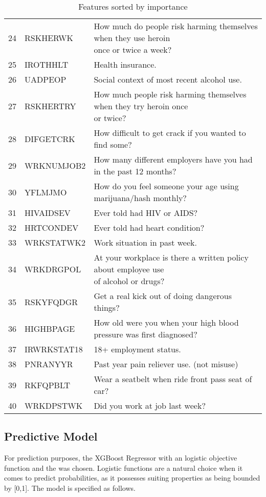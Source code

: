 \documentclass[12pt]{article}
\begin{document}
\begin{table}
\begin{tabular}{c|l|l}
		24 & RSKHERWK	&  \pbox{20cm}{How much do people risk harming themselves when they use heroin\\ once or twice a week?}	\\
		25 & IROTHHLT	& Health insurance.	\\
		26 & UADPEOP	& Social context of most recent alcohol use.	\\
		27 & RSKHERTRY	&\pbox{20cm}{How much people risk harming themselves when they try heroin once\\ or twice?}	\\
		28 & DIFGETCRK	& How difficult to get crack if you wanted to find some?	\\
		29 & WRKNUMJOB2	& How many different employers have you had in the past 12 months?	\\
		30 & YFLMJMO	& How do you feel someone your age using marijuana/hash monthly?	\\
		31 & HIVAIDSEV	& Ever told had HIV or AIDS?	\\
		32 & HRTCONDEV	&Ever told had heart condition?	\\
		33 & WRKSTATWK2	& Work situation in past week.	\\
		34 & WRKDRGPOL	& \pbox{20cm}{At your workplace is there a written policy about employee use\\ of alcohol or drugs?}	\\
		35 & RSKYFQDGR	& Get a real kick out of doing dangerous things?	\\
		36 & HIGHBPAGE	& How old were you when your high blood pressure was first diagnosed?	\\
		37 & IRWRKSTAT18 & 18+ employment status.	\\
		38 & PNRANYYR	& Past year pain reliever use. (not misuse)	\\
		39 & RKFQPBLT	& Wear a seatbelt when ride front pass seat of car?	\\
		40 & WRKDPSTWK	& Did you work at job last week?	\\		
	\end{tabular}
	\caption{Features sorted by importance}
	\label{featable}
\end{table}



\subsection{Predictive Model}
For prediction purposes, the XGBoost Regressor with an logistic objective function and the was chosen. Logistic functions are a natural choice when it comes to predict probabilities, as it possesses suiting properties as being bounded by [0,1]. The model is specified as follows.
\end{document}

